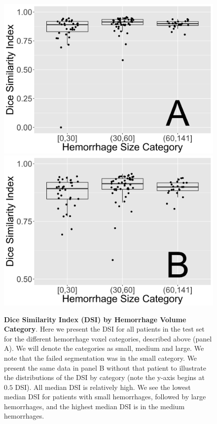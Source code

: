 \documentclass{elsarticle_nonatbib}\usepackage[]{graphicx}\usepackage[]{color}
\begin{document}
\begin{figure}
\centering
\includegraphics[width=0.48\linewidth,keepaspectratio]{DSI_Box_By_ICH_Cat_A.png}
\includegraphics[width=0.48\linewidth,keepaspectratio]{DSI_Box_By_ICH_Cat_B.png}
\caption{{\bf Dice Similarity Index (DSI) by Hemorrhage Volume Category}.  Here we present the DSI for all patients in the test set for the different hemorrhage voxel categories, described above (panel A).  We will denote the categories as small, medium and large.  We note that the failed segmentation was in the small category.  We present the same data in panel B without that patient to illustrate the distributions of the DSI by category (note the y-axis begins at $0.5$ DSI).  All median DSI is relatively high. We see the lowest median DSI for patients with small hemorrhages, followed by large hemorrhages, and the highest median DSI is in the medium hemorrhages.}
\label{fig:dsi_ich_cat}
\end{figure}



 
\end{document}
